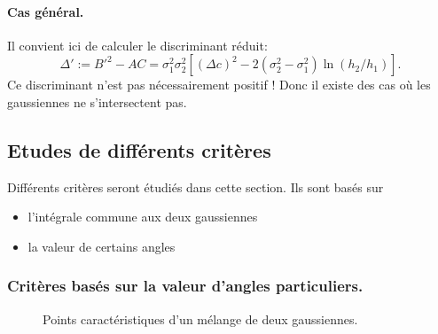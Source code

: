 \documentclass[main.tex]{subfiles}
\begin{document}
\paragraph{Cas général.} Il convient ici de calculer le discriminant réduit:
\begin{equation}
\label{eq:discr_reduit}
\Delta' := B'^2 - AC = \sigma_1^2 \sigma_2^2 \left[ (\Delta c)^2 - 2(\sigma_2^2-\sigma_1^2) \ln (h_2/h_1)  \right].
\end{equation}
Ce discriminant n'est pas nécessairement positif ! Donc il existe des cas où les gaussiennes ne s'intersectent pas.

\subsection{Etudes de différents critères}
Différents critères seront étudiés dans cette section. Ils sont basés sur
\begin{itemize}
\item l'intégrale commune aux deux gaussiennes
\item la valeur de certains angles
\end{itemize}

\subsubsection{Critères basés sur la valeur d'angles particuliers.}
\begin{figure}
\qquad
{}
\caption{\label{fig:pts_carac_intersection_gaussienne}Points caractéristiques d'un mélange de deux gaussiennes.}
\end{figure}
\end{document}
